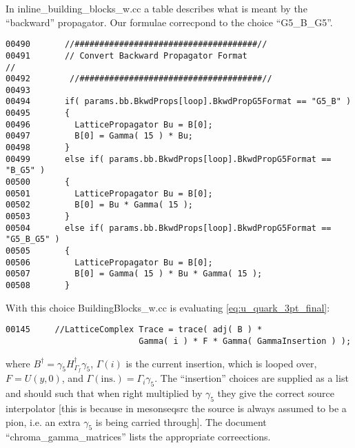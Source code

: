 \documentclass[12pt]{article}
\begin{document}
In inline\_building\_blocks\_w.cc a table describes what is meant by the ``backward'' propagator. Our formulae correcpond to the choice ``G5\_B\_G5''.
\begin{verbatim}
00490       //#####################################//
00491       // Convert Backward Propagator Format                      //
00492        //#####################################//
00493     
00494       if( params.bb.BkwdProps[loop].BkwdPropG5Format == "G5_B" )
00495       {
00496         LatticePropagator Bu = B[0];
00497         B[0] = Gamma( 15 ) * Bu;
00498       }
00499       else if( params.bb.BkwdProps[loop].BkwdPropG5Format == "B_G5" )
00500       {
00501         LatticePropagator Bu = B[0];
00502         B[0] = Bu * Gamma( 15 );
00503       }
00504       else if( params.bb.BkwdProps[loop].BkwdPropG5Format == "G5_B_G5" )
00505       {
00506         LatticePropagator Bu = B[0];
00507         B[0] = Gamma( 15 ) * Bu * Gamma( 15 );
00508       }
\end{verbatim}

With this choice BuildingBlocks\_w.cc is evaluating \ref{eq:u_quark_3pt_final}:
\begin{verbatim}
00145     //LatticeComplex Trace = trace( adj( B ) * 
                           Gamma( i ) * F * Gamma( GammaInsertion ) );
\end{verbatim}
where $B^\dag = \gamma_5 H_{\Gamma_f}^\dag \gamma_5$, $\Gamma(i)$ is
the current insertion, which is looped over, $F= U(y,0)$, and
$\Gamma(\mathrm{ins.})=\Gamma_i \gamma_5$. The ``insertion'' choices
are supplied as a list and should such that when right multiplied by
$\gamma_5$ they give the correct source interpolator [this is because
in mesonseqsrc the source is always assumed to be a pion, i.e. an
extra $\gamma_5$ is being carried through]. The document
``chroma\_gamma\_matrices'' lists the appropriate correections.

\end{document}
